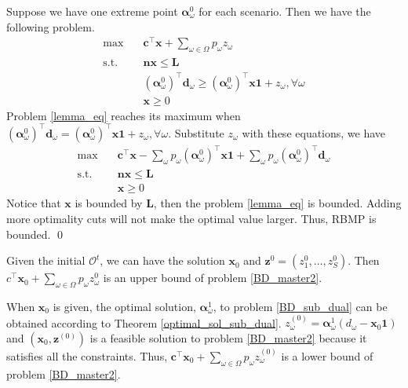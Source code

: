 \begin{pf}
  Suppose we have one extreme point $\bm{\alpha}_{\omega}^{0}$ for each scenario. Then we have the following problem.
  \begin{equation}\label{lemma_eq}
    \begin{aligned}
      \max \quad & \mathbf{c}^{\intercal} \mathbf{x} + \sum_{\omega \in \Omega} p_{\omega} z_{\omega} \\
      \text {s.t.} \quad & \mathbf{n} \mathbf{x} \leq \mathbf{L} \\
      & (\bm{\alpha}_{\omega}^{0})^{\intercal}\mathbf{d}_{\omega} \geq (\bm{\alpha}_{\omega}^{0})^{\intercal} \mathbf{x} \mathbf{1} + z_{\omega}, \forall \omega \\
       & \mathbf{x} \geq 0
    \end{aligned}
  \end{equation}
  Problem \eqref{lemma_eq} reaches its maximum when $(\bm{\alpha}_{\omega}^{0})^{\intercal}\mathbf{d}_{\omega} = (\bm{\alpha}_{\omega}^{0})^{\intercal} \mathbf{x} \mathbf{1} + z_{\omega}, \forall \omega$. Substitute $z_{\omega}$ with these equations, we have 
  \begin{equation}\label{lemma_eq2}
    \begin{aligned}
      \max \quad & \mathbf{c}^{\intercal} \mathbf{x} - \sum_{\omega}p_{\omega}(\bm{\alpha}_{\omega}^{0})^{\intercal} \mathbf{x} \mathbf{1} + \sum_{\omega} p_{\omega} (\bm{\alpha}_{\omega}^{0})^{\intercal} \mathbf{d}_{\omega} \\
      \text {s.t.} \quad & \mathbf{n} \mathbf{x} \leq \mathbf{L} \\
      & \mathbf{x} \geq 0
    \end{aligned}
  \end{equation}
  Notice that $\mathbf{x}$ is bounded by $\mathbf{L}$, then the problem \eqref{lemma_eq} is bounded. Adding more optimality cuts will not make the optimal value larger. Thus, RBMP is bounded. 
  \qed
\end{pf}

Given the initial $\mathcal{O}^{t}$, we can have the solution $\mathbf{x}_{0}$ and $\mathbf{z}^{0} =(z^{0}_1,\ldots, z^{0}_S)$. Then $c^{\intercal} \mathbf{x}_0 + \sum_{\omega \in \Omega} p_{\omega} z_{\omega}^{0}$ is an upper bound of problem \eqref{BD_master2}. 


When $\mathbf{x}_0$ is given, the optimal solution, $\bm{\alpha}_{\omega}^{1}$, to problem \eqref{BD_sub_dual} can be obtained according to Theorem \ref{optimal_sol_sub_dual}. $z_{\omega}^{(0)} = \bm{\alpha}_{\omega}^{1}(d_{\omega} - \mathbf{x}_0 \mathbf{1})$ and $(\mathbf{x}_0, \mathbf{z}^{(0)})$ is a feasible solution to problem \eqref{BD_master2} because it satisfies all the constraints. Thus, $\mathbf{c}^{\intercal} \mathbf{x}_0 + \sum_{\omega \in \Omega} p_{\omega} z_{\omega}^{(0)}$ is a lower bound of problem \eqref{BD_master2}.

